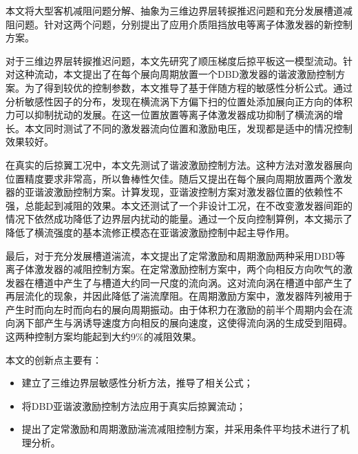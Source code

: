 \begin{cabstract}
  本文将大型客机减阻问题分解、抽象为三维边界层转捩推迟问题和充分发展槽道减阻问题。针对这两个问题，分别提出了应用介质阻挡放电等离子体激发器的新控制方案。

  对于三维边界层转捩推迟问题，本文先研究了顺压梯度后掠平板这一模型流动。针对这种流动，本文提出了在每个展向周期放置一个DBD激发器的谐波激励控制方案。为了得到较优的控制参数，本文推导了基于伴随方程的敏感性分析公式。通过分析敏感性因子的分布，发现在横流涡下方偏下扫的位置处添加展向正方向的体积力可以抑制扰动的发展。在这一位置放置等离子体激发器成功抑制了横流涡的增长。本文同时测试了不同的激发器流向位置和激励电压，发现都是适中的情况控制效果较好。

  在真实的后掠翼工况中，本文先测试了谐波激励控制方法。这种方法对激发器展向位置精度要求非常高，所以鲁棒性欠佳。随后又提出在每个展向周期放置两个激发器的亚谐波激励控制方案。计算发现，亚谐波控制方案对激发器位置的依赖性不强，总能起到减阻的效果。本文还测试了一个非设计工况，在不改变激发器间距的情况下依然成功降低了边界层内扰动的能量。通过一个反向控制算例，本文揭示了降低了横流强度的基本流修正模态在亚谐波激励控制中起主导作用。

  最后，对于充分发展槽道湍流，本文提出了定常激励和周期激励两种采用DBD等离子体激发器的减阻控制方案。在定常激励控制方案中，两个向相反方向吹气的激发器在槽道中产生了与槽道大约同一尺度的流向涡。这对流向涡在槽道中部产生了再层流化的现象，并因此降低了湍流摩阻。在周期激励方案中，激发器阵列被用于产生时而向左时而向右的展向周期振动。由于体积力在激励的前半个周期内会在流向涡下部产生与涡诱导速度方向相反的展向速度，这使得流向涡的生成受到阻碍。这两种控制方案均能起到大约9\%的减阻效果。

  本文的创新点主要有：
  \begin{itemize}
    \item 建立了三维边界层敏感性分析方法，推导了相关公式；
    \item 将DBD亚谐波激励控制方法应用于真实后掠翼流动；
    \item 提出了定常激励和周期激励湍流减阻控制方案，并采用条件平均技术进行了机理分析。
  \end{itemize}
\end{cabstract}


